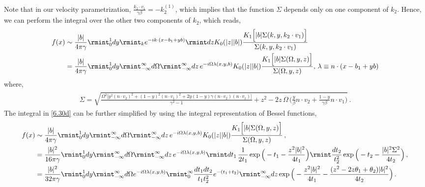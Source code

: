  Note that in our velocity parametrization, $\frac{k_2\cdot v_1}{\gamma\beta}=-k_2^{(1)}$, which implies that the function $\Sigma$ depends only on one component of $k_2$. Hence, we can perform the integral over the other two components of $k_2$, which reads,
 \begin{align}
     \begin{split}
         f(x)&\sim\frac{|b|}{4\pi\gamma}\rmint_0^1 dy \rmint_{k}e^{-ik\cdot (x-b_1+yb)}\rmint dz K_0(|z||b|)\frac{K_1\Big[|b|\Sigma(k,y,k_2\cdot v_1)\Big]}{\Sigma(k,y,k_2\cdot v_1)}\\ &
         =\frac{|b|}{4\pi\gamma}\rmint_{0}^1 dy\rmint_{-\infty}^{\infty} d \Omega\rmint_{-\infty}^\infty dz \,e^{-i \Omega \lambda(x,y,b)}K_{0}(|z||b|)\frac{K_1\Big[|b|\Sigma(\Omega,y,z)\Big]}{\Sigma(\Omega,y,z)},\,\lambda\equiv n\cdot(x-b_1+yb)\label{6.30d}
     \end{split}
 \end{align}
where,
\begin{align}
    \begin{split}
        \Sigma=\sqrt{\frac{\Omega^2\Big[y^2(n\cdot v_2)^2+(1-y)^2(n\cdot v_1)^2+2y(1-y)\gamma (n\cdot v_2)(n\cdot v_1)\Big]}{\gamma^2-1}+z^2-2z\,\Omega\,\Big(\frac{y}{\beta}n\cdot v_2+\frac{1-y}{\gamma\beta}n\cdot v_1\Big)}\,.
    \end{split}
\end{align}
The integral in \eqref{6.30d} can be further simplified by using the integral representation of Bessel functions,
\begin{align}
    \begin{split}
        f(x)&\sim  \frac{|b|}{4\pi\gamma}\rmint_{0}^1 dy\rmint_{-\infty}^{\infty} d \Omega\rmint_{-\infty}^\infty dz \,e^{-i \Omega \lambda(x,y,b)}K_{0}(|z||b|)\frac{K_1\Big[|b|\Sigma(\Omega,y,z)\Big]}{\Sigma(\Omega,y,z)}\,,\\ &
      =  \frac{|b|^2}{16\pi\gamma}\rmint_{0}^1 dy\rmint_{-\infty}^{\infty} d \Omega\rmint_{-\infty}^\infty dz \,e^{-i \Omega \lambda(x,y,b)}\rmint dt_1\, \frac{1}{2t_1}\exp\Big(-t_1-\frac{z^2 |b|^2}{4t_1}\Big)\rmint \frac{dt_2}{t_2^2}\exp\Big(-t_2-\frac{|b|^2\Sigma^2}{4t_2}\Big)\,,\\ &
      =\frac{|b|^2}{32\pi \gamma}\rmint_0^1 dy \rmint_{-\infty}^{\infty} d\Omega e^{-i \Omega\lambda(x,y,b)} \rmint_0^\infty \frac{dt_1 dt_2}{t_1 t_2^2}e^{-(t_1+t_2)}\rmint_{-\infty}^{\infty}dz \exp\Big(-\frac{z^2|b|^2}{4t_1}-\frac{(z^2-2z\theta_1+\theta_2)|b|^2}{4t_2}\Big)\,.
    \end{split}
\end{align}
